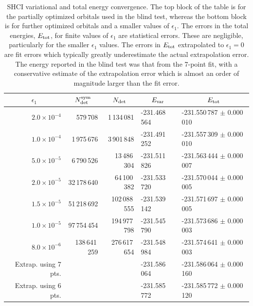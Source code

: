 \documentclass[journal=jcp,manuscript=suppinfo]{achemso}
\begin{document}
%
\begin{table}[ht!]
\begin{center}
\caption{SHCI variational and total energy convergence.  The top block of the table is for the
partially optimized orbitals used in the blind test, whereas the bottom block is for further optimized orbitals
and a smaller values of $\epsilon_1$.  The errors in the total energies, $E_{\rm tot}$, for finite values of $\epsilon_1$ are
statistical errors.  These are negligible, particularly for the smaller $\epsilon_1$ values.
The errors in $E_{\rm tot}$ extrapolated to $\epsilon_1=0$ are fit errors
which typically greatly underestimate the actual extrapolation error.  The energy reported in the blind test was that from the
7-point fit, with a conservative estimate of the extrapolation error which is almost an order of magnitude larger
than the fit error.}
\label{shci_energies}
\begin{tabular}{rrrll}
\toprule
\multicolumn{1}{c}{$\epsilon_1$} & \multicolumn{1}{c}{$N^{\rm sym}_{\rm det}$} & \multicolumn{1}{c}{$N_{\rm det}$} & \multicolumn{1}{c}{$E_{\rm var}$} & \multicolumn{1}{c}{$E_{\rm tot}$} \\
\midrule
$2.0 \times 10^{-4}$ &      579\,708 &   1\,134\,081 & -231.468\,564   & -231.550\,787 $\pm$ 0.000\,010 \\
$1.0 \times 10^{-4}$ &   1\,975\,676 &   3\,901\,848 & -231.491\,252   & -231.557\,309 $\pm$ 0.000\,010 \\
$5.0 \times 10^{-5}$ &   6\,790\,526 &  13\,486\,304 & -231.511\,826   & -231.563\,444 $\pm$ 0.000\,007 \\
$2.0 \times 10^{-5}$ &  32\,178\,640 &  64\,100\,382 & -231.533\,720   & -231.570\,044 $\pm$ 0.000\,005 \\
$1.5 \times 10^{-5}$ &  51\,218\,692 & 102\,088\,555 & -231.539\,142   & -231.571\,697 $\pm$ 0.000\,005 \\
$1.0 \times 10^{-5}$ &  97\,754\,454 & 194\,977\,798 & -231.545\,790   & -231.573\,686 $\pm$ 0.000\,003 \\
$8.0 \times 10^{-6}$ & 138\,641\,259 & 276\,617\,654 & -231.548\,984   & -231.574\,641 $\pm$ 0.000\,003 \\
Extrap. using 7 pts. &&&                               -231.586\,064   & -231.586\,064 $\pm$ 0.000\,160 \\
Extrap. using 6 pts. &&&                               -231.585\,772   & -231.585\,772 $\pm$ 0.000\,120 \\

\end{tabular}
\end{center}
\end{table}
\end{document}
